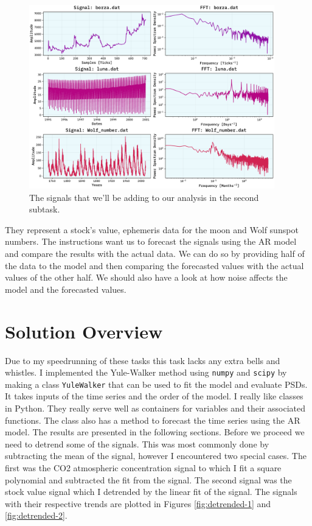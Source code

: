 \documentclass[10pt, titlepage, a4paper]{article}
\begin{document}
\begin{figure}[H]
    \centering
    \includegraphics[width=0.95\textwidth]{../LinForecast/Images/new-data.pdf}
    \caption{The signals that we'll be adding to our analysis in the second subtask.}
    \label{fig:signals-2}
\end{figure}

They represent a stock's value, ephemeris data for the moon and Wolf sunspot numbers. The instructions want us to
forecast the signals using the AR model and compare the results with the actual data. We can do so by providing half 
of the data to the model and then comparing the forecasted values with the actual values of the other half. We should also 
have a look at how noise affects the model and the forecasted values.

\section{Solution Overview}
Due to my speedrunning of these tasks this task lacks any extra bells and whistles. I implemented the Yule-Walker 
method using \texttt{numpy} and \texttt{scipy} by making a class \texttt{YuleWalker} that can be used to fit the 
model and evaluate PSDs. It takes inputs of the time series and the order of the model. I really like classes in Python.
They really serve well as containers for variables and their associated functions. The class also has a method to
forecast the time series using the AR model. The results are presented in the following sections. Before we proceed 
we need to detrend some of the signals. This was most commonly done by subtracting the mean of the signal, however I 
encountered two special cases. The first was the CO2 atmospheric concentration signal to which I fit a square 
polynomial and subtracted the fit from the signal. The second signal was the stock value signal which I detrended by
the linear fit of the signal. The signals with their respective trends are plotted in Figures \ref{fig:detrended-1} 
and \ref{fig:detrended-2}.
\end{document}
